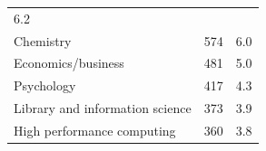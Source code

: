\documentclass[]{article}
\begin{document}
\begin{longtable}[]{@{}lrr@{}}
\begin{minipage}[t]{0.05\columnwidth}
6.2\strut
\end{minipage}\tabularnewline
\begin{minipage}[t]{0.81\columnwidth}\raggedright\strut
Chemistry\strut
\end{minipage} & \begin{minipage}[t]{0.05\columnwidth}\raggedleft\strut
574\strut
\end{minipage} & \begin{minipage}[t]{0.05\columnwidth}\raggedleft\strut
6.0\strut
\end{minipage}\tabularnewline
\begin{minipage}[t]{0.81\columnwidth}\raggedright\strut
Economics/business\strut
\end{minipage} & \begin{minipage}[t]{0.05\columnwidth}\raggedleft\strut
481\strut
\end{minipage} & \begin{minipage}[t]{0.05\columnwidth}\raggedleft\strut
5.0\strut
\end{minipage}\tabularnewline
\begin{minipage}[t]{0.81\columnwidth}\raggedright\strut
Psychology\strut
\end{minipage} & \begin{minipage}[t]{0.05\columnwidth}\raggedleft\strut
417\strut
\end{minipage} & \begin{minipage}[t]{0.05\columnwidth}\raggedleft\strut
4.3\strut
\end{minipage}\tabularnewline
\begin{minipage}[t]{0.81\columnwidth}\raggedright\strut
Library and information science\strut
\end{minipage} & \begin{minipage}[t]{0.05\columnwidth}\raggedleft\strut
373\strut
\end{minipage} & \begin{minipage}[t]{0.05\columnwidth}\raggedleft\strut
3.9\strut
\end{minipage}\tabularnewline
\begin{minipage}[t]{0.81\columnwidth}\raggedright\strut
High performance computing\strut
\end{minipage} & \begin{minipage}[t]{0.05\columnwidth}\raggedleft\strut
360\strut
\end{minipage} & \begin{minipage}[t]{0.05\columnwidth}\raggedleft\strut
3.8\strut
\end{minipage}\tabularnewline

\end{longtable}
\end{document}
